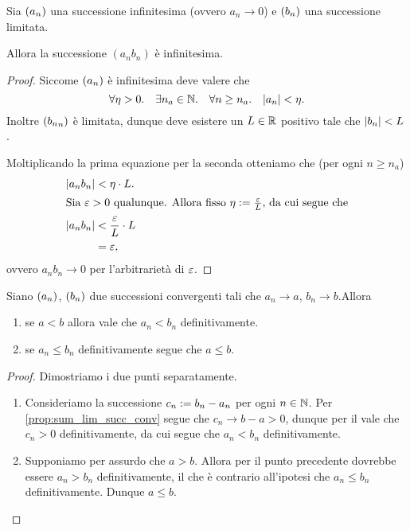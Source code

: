 \begin{proposition}
     \label{prop:inf*lim=>inf}
    Sia $\seqn*{a}$ una successione infinitesima (ovvero $a_n \to 0$) e $\seqn*{b}$ una successione limitata.

    Allora la successione $(a_nb_n)$ è infinitesima.
\end{proposition}
\begin{proof}
    Siccome $\seqn*{a}$ è infinitesima deve valere che \begin{equation*}
        \forall \eta > 0. \quad \exists n_a \in \N. \quad \forall n \geq n_a. \quad \abs*{a_n} < \eta.
    \end{equation*} Inoltre $\seqn*{b_n}$ è limitata, dunque deve esistere un $L \in \R$ positivo tale che $\abs*{b_n} < L$.

    Moltiplicando la prima equazione per la seconda otteniamo che (per ogni $n \geq n_a$)
    \begin{align*}
        \abs*{a_nb_n} &< \eta \cdot L. \\
        \intertext{Sia $\eps > 0$ qualunque. Allora fisso $\eta \deq \frac{\eps}{L}$, da cui segue che}
        \abs*{a_nb_n} &< \frac{\eps}{L} \cdot L \\
        &= \eps,
    \end{align*}
    ovvero $a_nb_n \to 0$ per l'arbitrarietà di $\eps$.
\end{proof}

\begin{unnamed}
     \label{th:confr_2_succ}
    Siano $\seqn*{a}$, $\seqn*{b}$ due successioni convergenti tali che $a_n \to a$, $b_n \to b$.Allora \begin{enumerate}[label={(\roman*)}, ref={\nameref*{th:confr_2_succ} (\ref*{th:confr_2_succ}: (\roman*))}]
        \item se $a < b$ allora vale che $a_n < b_n$ definitivamente.
        \item se $a_n \leq b_n$ definitivamente segue che $a \leq b$.
    \end{enumerate}
\end{unnamed}
\begin{proof}
    Dimostriamo i due punti separatamente. \begin{enumerate}[label={(\roman*)}]
        \item Consideriamo la successione $c_n \deq b_n - a_n$ per ogni $n \in \N$. Per \autoref{prop:sum_lim_succ_conv} segue che $c_n \to b - a > 0$, dunque per il  vale che $c_n > 0$ definitivamente, da cui segue che $a_n < b_n$ definitivamente.
        \item Supponiamo per assurdo che $a > b$. Allora per il punto precedente dovrebbe essere $a_n > b_n$ definitivamente, il che è contrario all'ipotesi che $a_n \leq b_n$ definitivamente. Dunque $a \leq b$. \qedhere
    \end{enumerate}
\end{proof}

